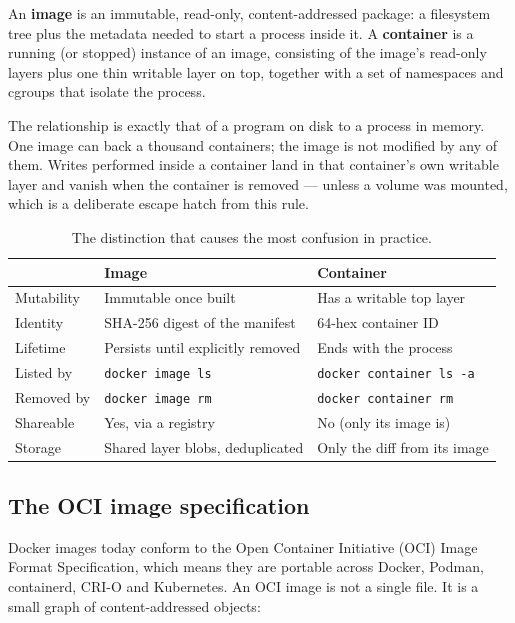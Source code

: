 \documentclass[10pt,a4paper]{article}
\newcommand{\cmd}[1]{\texttt{\small #1}}
\begin{document}
An \textbf{image} is an immutable, read-only, content-addressed
package: a filesystem tree plus the metadata needed to start a process
inside it. A \textbf{container} is a running (or stopped) instance of an
image, consisting of the image's read-only layers plus one thin writable
layer on top, together with a set of namespaces and cgroups that isolate
the process.

The relationship is exactly that of a program on disk to a process in
memory. One image can back a thousand containers; the image is not
modified by any of them. Writes performed inside a container land in
that container's own writable layer and vanish when the container is
removed --- unless a volume was mounted, which is a deliberate escape
hatch from this rule.

\begin{table}[htbp]
\centering
\caption{The distinction that causes the most confusion in practice.}
\label{tab:imgvscon}
\footnotesize
\begin{tabularx}{\linewidth}{@{}l X X@{}}
\toprule
 & \textbf{Image} & \textbf{Container} \\
\midrule
Mutability   & Immutable once built            & Has a writable top layer \\
Identity     & SHA-256 digest of the manifest  & 64-hex container ID \\
Lifetime     & Persists until explicitly removed & Ends with the process \\
Listed by    & \cmd{docker image ls}           & \cmd{docker container ls -a} \\
Removed by   & \cmd{docker image rm}           & \cmd{docker container rm} \\
Shareable    & Yes, via a registry             & No (only its image is) \\
Storage      & Shared layer blobs, deduplicated & Only the diff from its image \\
\bottomrule
\end{tabularx}
\end{table}

\subsection{The OCI image specification}

Docker images today conform to the Open Container Initiative (OCI) Image
Format Specification, which means they are portable across Docker,
Podman, containerd, CRI-O and Kubernetes. An OCI image is not a single
file. It is a small graph of content-addressed objects:
\end{document}
